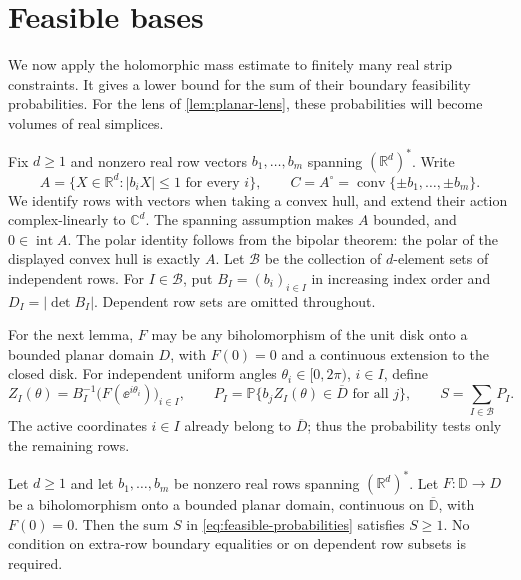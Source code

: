 \section{Feasible bases}\label{sec:feasibility}

We now apply the holomorphic mass estimate to finitely many real strip constraints. It gives a lower bound for the sum of their boundary feasibility probabilities. For the lens of \cref{lem:planar-lens}, these probabilities will become volumes of real simplices.

Fix $d\geq1$ and nonzero real row vectors $b_1,\ldots,b_m$ spanning $(\mathbb{R}^d)^*$. Write
\begin{equation}\label{eq:strip-body}
 A=\{X\in\mathbb{R}^d:|b_iX|\leq1\text{ for every }i\},
 \qquad C=A^\circ=\operatorname{conv}\{\pm b_1,\ldots,\pm b_m\}.
\end{equation}
We identify rows with vectors when taking a convex hull, and extend their action complex-linearly to $\mathbb{C}^d$. The spanning assumption makes $A$ bounded, and $0\in\operatorname{int}A$. The polar identity follows from the bipolar theorem: the polar of the displayed convex hull is exactly $A$. Let $\mathcal{B}$ be the collection of $d$-element sets of independent rows. For $I\in\mathcal{B}$, put $B_I=(b_i)_{i\in I}$ in increasing index order and $D_I=|\det B_I|$. Dependent row sets are omitted throughout.

For the next lemma, $F$ may be any biholomorphism of the unit disk onto a bounded planar domain $D$, with $F(0)=0$ and a continuous extension to the closed disk. For independent uniform angles $\theta_i\in[0,2\pi)$, $i\in I$, define
\begin{equation}\label{eq:feasible-probabilities}
 Z_I(\theta)=B_I^{-1}\bigl(F(\ee^{i\theta_i})\bigr)_{i\in I},
 \qquad
 P_I=\mathbb{P}\{b_jZ_I(\theta)\in\overline D\text{ for all }j\},
 \qquad S=\sum_{I\in\mathcal{B}}P_I.
\end{equation}
The active coordinates $i\in I$ already belong to $\overline D$; thus the probability tests only the remaining rows.

\begin{lemma}\label{lem:holomorphic-feasibility}
Let $d\ge1$ and let $b_1,\ldots,b_m$ be nonzero real rows spanning $(\mathbb{R}^d)^*$. Let $F:\mathbb{D}\to D$ be a biholomorphism onto a bounded planar domain, continuous on $\overline{\mathbb{D}}$, with $F(0)=0$. Then the sum $S$ in \eqref{eq:feasible-probabilities} satisfies $S\ge1$. No condition on extra-row boundary equalities or on dependent row subsets is required.
\end{lemma}

